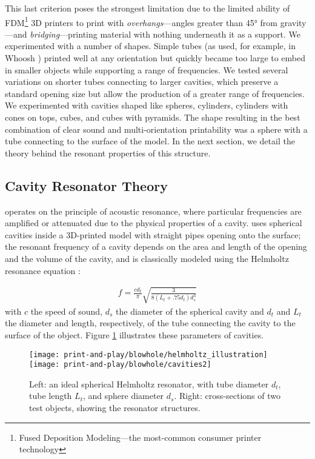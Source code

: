     This last criterion poses the strongest limitation due to the limited
    ability of FDM\footnote{Fused Deposition Modeling---the most-common consumer
    printer technology} 3D printers to print with \textit{overhangs}---angles
    greater than 45° from gravity---and \textit{bridging}---printing
    material with nothing underneath it as a support. We experimented with a
    number of shapes. Simple tubes (as used, for example, in Whoosh
    \cite{Reyes:2016}) printed well at any orientation but quickly became too
    large to embed in smaller objects while supporting a range of frequencies.
    We tested several variations on shorter tubes connecting to larger cavities,
    which preserve a standard opening size but allow the production of a greater
    range of frequencies. We experimented with cavities shaped like spheres,
    cylinders, cylinders with cones on tops, cubes, and cubes with pyramids. The
    shape resulting in the best combination of clear sound and multi-orientation
    printability was a sphere with a tube connecting to the surface of the
    model. In the next section, we detail the theory behind the resonant
    properties of this structure.

    \subsection{Cavity Resonator Theory}
      \bh operates on the principle of acoustic resonance, where particular
      frequencies are amplified or attenuated due to the physical properties of
      a cavity. \bh uses spherical cavities inside a 3D-printed model with
      straight pipes opening onto the surface; the resonant frequency of a
      cavity depends on the area and length of the opening and the volume of the
      cavity, and is classically modeled using the Helmholtz resonance equation
      \cite{Helmholtz:1885vp}:

      \begin{align}\label{eq:hhz}
        f = \frac{cd_t}{\pi}\sqrt{\frac{3}{8(L_t+.75 d_t)d_s^3}}
      \end{align}
      with $c$ the speed of sound, $d_s$ the diameter of the spherical cavity
      and $d_t$ and $L_t$ the diameter and length, respectively, of the tube
      connecting the cavity to the surface of the object. Figure \ref{fig:resonator}
      illustrates these parameters of \bh cavities.
      
      \begin{figure}
        \centering
        \texttt{[image: print-and-play/blowhole/helmholtz\_illustration]}
        \quad
        \texttt{[image: print-and-play/blowhole/cavities2]}
        \caption{Left: an ideal spherical Helmholtz resonator, with tube
          diameter $d_t$, tube length $L_t$, and sphere diameter $d_s$. Right:
          cross-sections of two \bh test objects, showing the resonator
          structures.}
        \label{fig:resonator}
      \end{figure}         

